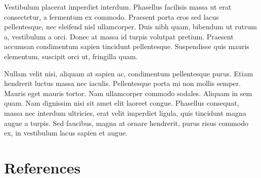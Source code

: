 \documentclass[12pt,a4paper]{article}
\begin{document}
Vestibulum placerat imperdiet interdum. Phasellus facilisis massa ut erat consectetur, a fermentum ex commodo. Praesent porta eros sed lacus pellentesque, nec eleifend nisl ullamcorper. Duis nibh quam, bibendum ut rutrum a, vestibulum a orci. Donec at massa id turpis volutpat pretium. Praesent accumsan condimentum sapien tincidunt pellentesque. Suspendisse quis mauris elementum, suscipit orci ut, fringilla quam.

Nullam velit nisi, aliquam at sapien ac, condimentum pellentesque purus. Etiam hendrerit luctus massa nec iaculis. Pellentesque porta mi non mollis semper. Mauris eget mauris tortor. Nam ullamcorper commodo sodales. Aliquam in sem quam. Nam dignissim nisi sit amet elit laoreet congue. Phasellus consequat, massa nec interdum ultricies, erat velit imperdiet ligula, quis tincidunt magna augue a turpis. Sed faucibus, magna at ornare hendrerit, purus risus commodo ex, in vestibulum lacus sapien et augue. 

\newpage
\section{References}
\end{document}
